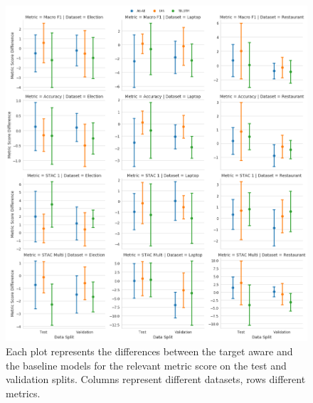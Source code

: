 \begin{figure}[!h]
    \centering
    \includegraphics[scale=0.3]{images/augmentation/methods_performance/Inter_Target/overall_difference_inter_target_scores.png}
    \caption{Each plot represents the differences between the target aware and the baseline models for the relevant metric score on the test and validation splits. Columns represent different datasets, rows different metrics.}
    \label{fig:aug_overall_difference_inter_target_scores}
\end{figure}

